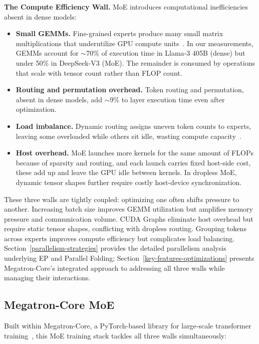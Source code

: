 \textbf{The Compute Efficiency Wall.} MoE introduces computational inefficiencies absent in dense models:
\begin{itemize}[nosep,leftmargin=*]
    \item \textbf{Small GEMMs.} Fine-grained experts produce many small matrix multiplications that underutilize GPU compute units~\cite{megablocks}. In our measurements, GEMMs account for $\sim$70\% of execution time in Llama-3 405B (dense) but under 50\% in DeepSeek-V3 (MoE). The remainder is consumed by operations that scale with tensor count rather than FLOP count.
    \item \textbf{Routing and permutation overhead.} Token routing and permutation, absent in dense models, add $\sim$9\% to layer execution time even after optimization.
    \item \textbf{Load imbalance.} Dynamic routing assigns uneven token counts to experts, leaving some overloaded while others sit idle, wasting compute capacity~\cite{wang2024auxiliarylossfreeloadbalancingstrategy}.
    \item \textbf{Host overhead.} MoE launches more kernels for the same amount of FLOPs because of sparsity and routing, and each launch carries fixed host-side cost, these add up and leave the GPU idle between kernels. In dropless MoE, dynamic tensor shapes further require costly host-device synchronization.
\end{itemize}

These three walls are tightly coupled: optimizing one often shifts pressure to another. Increasing batch size improves GEMM utilization but amplifies memory pressure and communication volume. CUDA Graphs eliminate host overhead but require static tensor shapes, conflicting with dropless routing. Grouping tokens across experts improves compute efficiency but complicates load balancing. Section~\ref{parallelism-strategies} provides the detailed parallelism analysis underlying EP and Parallel Folding; Section~\ref{key-features-optimizations} presents Megatron-Core's integrated approach to addressing all three walls while managing their interactions.


\subsection{Megatron-Core MoE}
Built within Megatron-Core, a PyTorch-based library for large-scale transformer training~\cite{shoeybi2020megatronlmtrainingmultibillionparameter,paszke2019pytorchimperativestylehighperformance}, this MoE training stack tackles all three walls simultaneously:

